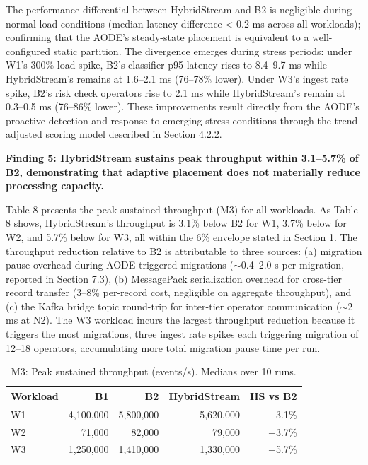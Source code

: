 \documentclass[preprint,review,12pt]{elsarticle}
\begin{document}
The performance differential between HybridStream and B2 is negligible during normal load conditions (median latency difference < 0.2 ms across all workloads); confirming that the AODE's steady-state placement is equivalent to a well-configured static partition. The divergence emerges during stress periods: under W1's 300\% load spike, B2's classifier p95 latency rises to 8.4--9.7 ms while HybridStream's remains at 1.6--2.1 ms (76--78\% lower). Under W3's ingest rate spike, B2's risk check operators rise to 2.1 ms while HybridStream's remain at 0.3--0.5 ms (76--86\% lower). These improvements result directly from the AODE's proactive detection and response to emerging stress conditions through the trend-adjusted scoring model described in Section 4.2.2.

\textbf{Finding 5: HybridStream sustains peak throughput within 3.1--5.7\% of B2, demonstrating that adaptive placement does not materially reduce processing capacity.}

Table 8 presents the peak sustained throughput (M3) for all workloads. As Table 8 shows, HybridStream's throughput is 3.1\% below B2 for W1, 3.7\% below for W2, and 5.7\% below for W3, all within the 6\% envelope stated in Section 1. The throughput reduction relative to B2 is attributable to three sources: (a) migration pause overhead during AODE-triggered migrations ($\sim$0.4--2.0 s per migration, reported in Section 7.3), (b) MessagePack serialization overhead for cross-tier record transfer (3--8\% per-record cost, negligible on aggregate throughput), and (c) the Kafka bridge topic round-trip for inter-tier operator communication ($\sim$2 ms at N2). The W3 workload incurs the largest throughput reduction because it triggers the most migrations, three ingest rate spikes each triggering migration of 12--18 operators, accumulating more total migration pause time per run.


\begin{table}[htbp]
\centering
\caption{M3: Peak sustained throughput (events/s). Medians over 10 runs.}
\label{tab:throughput}
\begin{tabular}{@{}lrrrr@{}}
\toprule
Workload & B1 & B2 & HybridStream & HS vs B2 \\
\midrule
W1 & 4,100,000 & 5,800,000 & 5,620,000 & $-$3.1\% \\
W2 & 71,000 & 82,000 & 79,000 & $-$3.7\% \\
W3 & 1,250,000 & 1,410,000 & 1,330,000 & $-$5.7\% \\
\bottomrule
\end{tabular}
\end{table}
\end{document}

